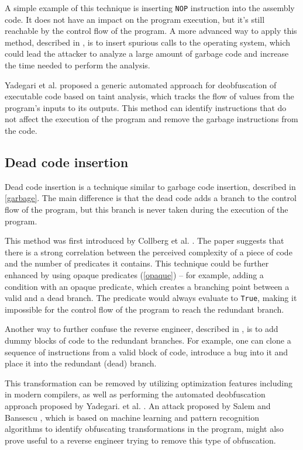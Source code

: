 \documentclass[
  digital, %
  table,   %
  twoside, %
  nolof,     %
  nolot,     %
]{fithesis3}
\theoremstyle{definition}
\begin{document}
A simple example of this technique is inserting \texttt{NOP} instruction into the assembly code. It does not have an impact on the program execution, but it's still reachable by the control flow of the program. A more advanced way to apply this method, described in \cite{os_protection}, is to insert spurious calls to the operating system, which could lead the attacker to analyze a large amount of garbage code and increase the time needed to perform the analysis. 

Yadegari et al. \cite{generic_deobfuscation} proposed a generic automated approach for deobfuscation of executable code based on taint analysis, which tracks the flow of values from the program's inputs to its outputs. This method can identify instructions that do not affect the execution of the program and remove the garbage instructions from the code. 

\subsection{Dead code insertion} \label{dead}
Dead code insertion is a technique similar to garbage code insertion, described in \ref{garbage}. The main difference is that the dead code adds a branch to the control flow of the program, but this branch is never taken during the execution of the program. 

This method was first introduced by Collberg et al. \cite{taxonomy_obf}. The paper suggests that there is a strong correlation between the perceived complexity of a piece of code and the number of predicates it contains. This technique could be further enhanced by using opaque predicates (\ref{opaque}) -- for example, adding a condition with an opaque predicate, which creates a branching point between a valid and a dead branch. The predicate would always evaluate to \texttt{True}, making it impossible for the control flow of the program to reach the redundant branch. 

Another way to further confuse the reverse engineer, described in \cite{taxonomy_obf}, is to add dummy blocks of code to the redundant branches. For example, one can clone a sequence of instructions from a valid block of code, introduce a bug into it and place it into the redundant (dead) branch. 

This transformation can be removed by utilizing optimization features including in modern compilers, as well as performing the automated deobfuscation approach proposed by Yadegari. et al. \cite{generic_deobfuscation}. An attack proposed by Salem and Bansescu \cite{ml_deobfuscation}, which is based on machine learning and pattern recognition algorithms to identify obfuscating transformations in the program, might also prove useful to a reverse engineer trying to remove this type of obfuscation. 
\end{document}
